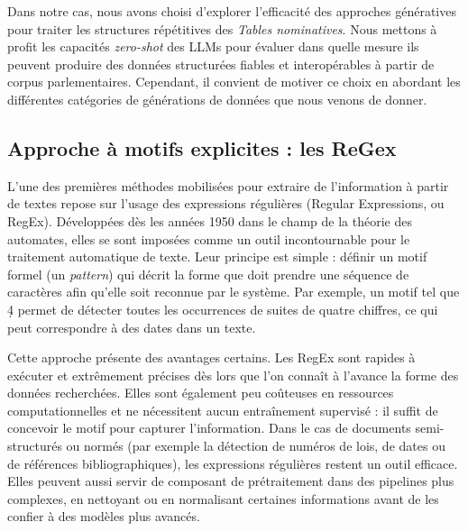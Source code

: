 Dans notre cas, nous avons choisi d’explorer l’efficacité des approches génératives pour traiter les structures répétitives des \emph{Tables nominatives}. Nous mettons à profit les capacités \emph{zero-shot} des LLMs pour évaluer dans quelle mesure ils peuvent produire des données structurées fiables et interopérables à partir de corpus parlementaires. Cependant, il convient de motiver ce choix en abordant les différentes catégories de générations de données que nous venons de donner.

\subsection{Approche à motifs explicites : les ReGex}

L’une des premières méthodes mobilisées pour extraire de l’information à partir de textes repose sur l’usage des expressions régulières (Regular Expressions, ou RegEx). Développées dès les années 1950 dans le champ de la théorie des automates, elles se sont imposées comme un outil incontournable pour le traitement automatique de texte. Leur principe est simple : définir un motif formel (un \emph{pattern}) qui décrit la forme que doit prendre une séquence de caractères afin qu’elle soit reconnue par le système. Par exemple, un motif tel que \d{4} permet de détecter toutes les occurrences de suites de quatre chiffres, ce qui peut correspondre à des dates dans un texte.

Cette approche présente des avantages certains. Les RegEx sont rapides à exécuter et extrêmement précises dès lors que l’on connaît à l’avance la forme des données recherchées. Elles sont également peu coûteuses en ressources computationnelles et ne nécessitent aucun entraînement supervisé : il suffit de concevoir le motif pour capturer l’information. Dans le cas de documents semi-structurés ou normés (par exemple la détection de numéros de lois, de dates ou de références bibliographiques), les expressions régulières restent un outil efficace. Elles peuvent aussi servir de composant de prétraitement dans des pipelines plus complexes, en nettoyant ou en normalisant certaines informations avant de les confier à des modèles plus avancés.

